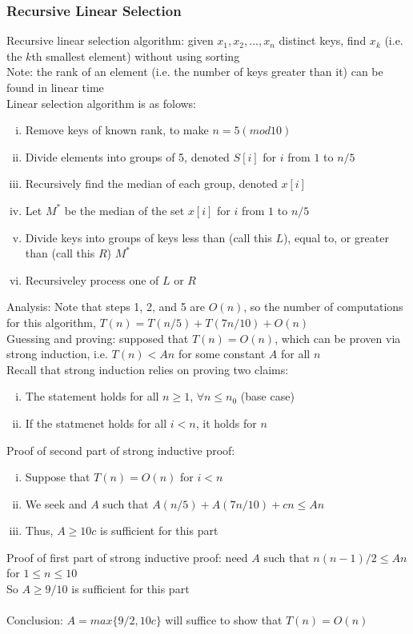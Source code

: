 \documentclass{article}
\begin{document}
			\subsubsection{Recursive Linear Selection}
				Recursive linear selection algorithm: given $x_1, x_2, ..., x_n$ distinct keys, find $x_k$ (i.e. the $k$th smallest element) without using sorting \\
				Note: the rank of an element (i.e. the number of keys greater than it) can be found in linear time \\
				Linear selection algorithm is as folows:
				\begin{enumerate}[(i)]
					\item Remove keys of known rank, to make $n = 5 (mod 10)$
					\item Divide elements into groups of 5, denoted $S[i]$ for $i$ from $1$ to $n/5$
					\item Recursively find the median of each group, denoted $x[i]$
					\item Let $M^*$ be the median of the set $x[i]$ for $i$ from $1$ to $n/5$
					\item Divide keys into groups of keys less than (call this $L$), equal to, or greater than (call this $R$) $M^*$
					\item Recursiveley process one of $L$ or $R$
					\end{enumerate}
				Analysis: Note that steps 1, 2, and 5 are $O(n)$, so the number of computations for this algorithm, $T(n) = T(n/5) + T(7n/10) + O(n)$ \\
				Guessing and proving: supposed that $T(n) = O(n)$, which can be proven via strong induction, i.e. $T(n) < An$ for some constant $A$ for all $n$ \\
				Recall that strong induction relies on proving two claims:
				\begin{enumerate}[(i)]
					\item The statement holds for all $n \geq 1$, $\forall n \leq n_0$ (base case)
					\item If the statmenet holds for all $i < n$, it holds for $n$
					\end{enumerate}
				Proof of second part of strong inductive proof:
				\begin{enumerate}[(i)]
					\item Suppose that $T(n) = O(n)$ for $i < n$
					\item We seek and $A$ such that $A(n/5) + A(7n/10) + cn \leq An$
					\item Thus, $A \geq 10c$ is sufficient for this part
					\end{enumerate}
				Proof of first part of strong inductive proof: need $A$ such that $n(n - 1)/2 \leq An$ for $1 \leq n \leq 10$ \\
				So $A \geq 9/10$ is sufficient for this part \\
				\\
				Conclusion: $A = max\{9/2, 10c\}$ will suffice to show that $T(n) = O(n)$ 
\end{document}
